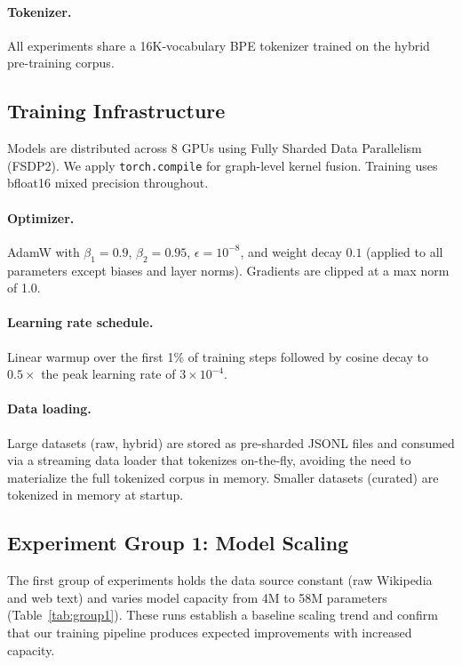 \paragraph{Tokenizer.}
All experiments share a 16K-vocabulary BPE tokenizer trained on the hybrid
pre-training corpus.

\subsection{Training Infrastructure}
\label{sec:infra}

Models are distributed across 8 GPUs using Fully Sharded Data Parallelism
(FSDP2).  We apply \texttt{torch.compile} for graph-level kernel fusion.
Training uses bfloat16 mixed precision throughout.

\paragraph{Optimizer.}
AdamW with $\beta_1=0.9$, $\beta_2=0.95$, $\epsilon=10^{-8}$, and weight
decay $0.1$ (applied to all parameters except biases and layer norms).
Gradients are clipped at a max norm of 1.0.

\paragraph{Learning rate schedule.}
Linear warmup over the first 1\% of training steps followed by cosine decay
to $0.5\times$ the peak learning rate of $3\times10^{-4}$.

\paragraph{Data loading.}
Large datasets (raw, hybrid) are stored as pre-sharded JSONL files and
consumed via a streaming data loader that tokenizes on-the-fly, avoiding the
need to materialize the full tokenized corpus in memory.  Smaller datasets
(curated) are tokenized in memory at startup.

\subsection{Experiment Group 1: Model Scaling}
\label{sec:group1}

The first group of experiments holds the data source constant (raw Wikipedia
and web text) and varies model capacity from 4M to 58M parameters
(Table~\ref{tab:group1}).  These runs establish a baseline scaling trend and
confirm that our training pipeline produces expected improvements with
increased capacity.

